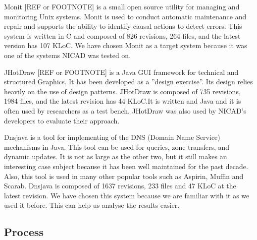 \documentclass[conference]{IEEEtran}
\begin{document}
\begin{table}[]
\centering
\caption{List of Target Systems in Terms of Files and Kilo Line of Code (KLOC) at current version and Language}
\label{tab:sut}
\end{table}

Monit [REF or FOOTNOTE] is a small open source utility for managing and monitoring Unix systems.
Monit is used to conduct automatic maintenance and repair and supports the ability to identify causal actions to detect errors.
This system is written in C and composed of 826 revisions, 264 files, and the latest version has 107 KLoC.
We have chosen Monit as a target system because it was one of the systems NICAD was tested on.

JHotDraw [REF or FOOTNOTE] is a Java GUI framework for technical and structured Graphics.
It has been developed as a ''design exercise''. Its design relies heavily on the use of design patterns. JHotDraw is composed of 735 revisions, 1984 files, and the latest revision has 44 KLoC.It is written and Java and it is often used by researchers as a test bench. JHotDraw was also used by NICAD's developers to evaluate their approach.

Dnsjava \cite{Wellington2013} is a tool for implementing of the DNS (Domain Name Service) mechanisms in Java.
This tool can be used for queries, zone transfers, and dynamic updates.
It is not as large as the other two, but it still makes an interesting case subject because it has been well maintained for the past decade. Also, this tool is used in many other popular tools such as Aspirin, Muffin and
Scarab. Dnsjava is composed of 1637 revisions, 233 files and 47 KLoC at the latest revision.
We have chosen this system because we are familiar with it as we used it before\cite{Nayrolles2015c}. This can help us analyse the results easier.

\subsection{Process}
\label{sub:Process}
\end{document}
